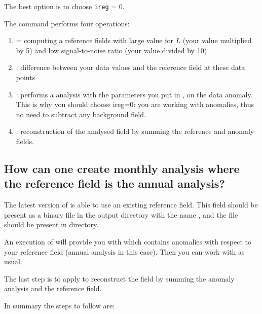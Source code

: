 The best option is to choose \texttt{ireg} = 0.

The command  performs four operations:
\begin{enumerate}
\item {} = computing a reference fields with large value for $L$ (your
value multiplied by 5) and low signal-to-noise ratio (your value divided by 10)

\item {}: difference between your data values and the reference field at
these data points

\item {}: performs a \diva analysis with the parameters you put in
, on the data anomaly. This is why you should choose ireg=0: you
are working with anomalies, thus no need to subtract any background field.

\item {}: reconstruction of the analysed field by summing the reference
and anomaly fields.

\end{enumerate}


\subsection{How can one create monthly analysis where the reference field is the annual analysis?}

The latest version of  is able to use an existing reference field. This field should be present as a binary file in the output directory with the name , and the  file should be present in  directory.

An execution of  will provide you with  which contains anomalies with respect to your reference field (annual analysis in this case). Then you can work with  as usual. 

The last step is to apply  to reconstruct the field by summing the anomaly analysis and the reference field.

In summary the steps to follow are:

